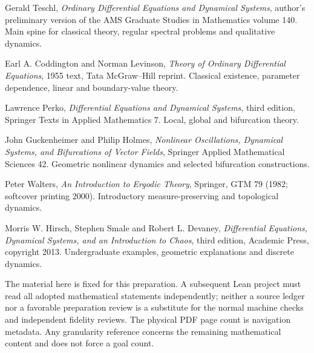 \documentclass[11pt,oneside]{book}
\theoremstyle{definition}
\theoremstyle{remark}\newtheorem{remark}[theorem]{Remark}
\begin{document}
\begin{description}[style=nextline,leftmargin=12mm]
\item[T.] Gerald Teschl, \emph{Ordinary Differential Equations and Dynamical
Systems}, author's preliminary version of the AMS Graduate Studies in
Mathematics volume 140. Main spine for classical theory, regular spectral
problems and qualitative dynamics.
\item[CL.] Earl A. Coddington and Norman Levinson, \emph{Theory of Ordinary
Differential Equations}, 1955 text, Tata McGraw--Hill reprint. Classical
existence, parameter dependence, linear and boundary-value theory.
\item[P.] Lawrence Perko, \emph{Differential Equations and Dynamical Systems},
third edition, Springer Texts in Applied Mathematics 7. Local, global and
bifurcation theory.
\item[GH.] John Guckenheimer and Philip Holmes, \emph{Nonlinear Oscillations,
Dynamical Systems, and Bifurcations of Vector Fields}, Springer Applied
Mathematical Sciences 42. Geometric nonlinear dynamics and selected
bifurcation constructions.
\item[W.] Peter Walters, \emph{An Introduction to Ergodic Theory},
Springer, GTM 79 (1982; softcover printing 2000).
Introductory measure-preserving and topological dynamics.
\item[HSD.] Morris W. Hirsch, Stephen Smale and Robert L. Devaney,
\emph{Differential Equations, Dynamical Systems, and an Introduction to
Chaos}, third edition, Academic Press, copyright 2013. Undergraduate
examples, geometric explanations and discrete dynamics.
\end{description}

The material here is fixed for this preparation. A subsequent Lean project
must read all adopted mathematical statements independently; neither a
source ledger nor a favorable preparation review is a substitute for the
normal machine checks and independent fidelity reviews. The physical PDF
page count is navigation metadata. Any granularity reference concerns the
remaining mathematical content and does not force a goal count.

\end{document}
